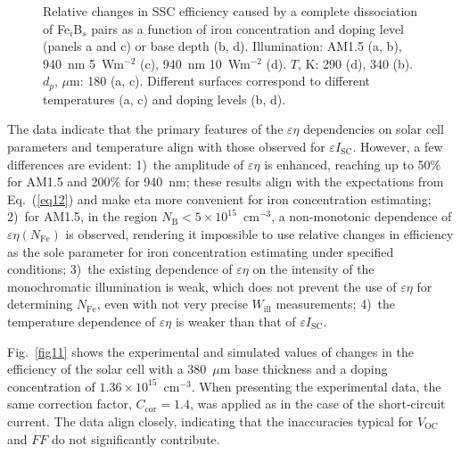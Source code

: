 \documentclass[a4paper,fleqn]{cas-sc}
\begin{document}
\begin{figure}
	  \caption{Relative changes in SSC efficiency caused by a complete
       dissociation of Fe$_i$B$_s$ pairs as a function of
       iron concentration and
       doping level (panels a and c) or base depth (b, d).
       Illumination: AM1.5 (a, b), 940~nm 5~Wm$^{-2}$ (c),  940~nm 10~Wm$^{-2}$ (d).
       $T$, K: 290 (d), 340 (b).
       $d_p$, $\mu$m: 180 (a, c).
       Different surfaces correspond to different temperatures (a, c) and doping levels (b, d).
}\label{fig10}
\end{figure}

The data indicate that the primary features of the $\varepsilon \eta$ dependencies
on solar cell parameters and temperature align with those observed for $\varepsilon I_\mathrm{SC}$.
However, a few differences are evident:
1)~the amplitude of  $\varepsilon \eta$ is enhanced,
reaching up to 50\% for AM1.5 and 200\% for 940~nm;
these results align with the expectations from Eq.~(\ref{eq12})
and make eta more convenient for iron concentration estimating;
2)~for AM1.5, in the region $N_\mathrm{B}<5\times10^{15}$~cm$^{-3}$,
a non-monotonic dependence of $\varepsilon \eta$$\left(N_\mathrm{Fe}\right)$ is observed,
rendering it impossible to use relative changes in efficiency as the sole parameter for iron concentration estimating under specified conditions;
3)~the existing dependence of $\varepsilon \eta$ on the intensity of the monochromatic illumination is weak,
which does not prevent the use of $\varepsilon \eta$ for determining $N_\mathrm{Fe}$, even with not very precise $W_\mathrm{ill}$ measurements;
4)~the temperature dependence of $\varepsilon \eta$ is weaker than that of $\varepsilon I_\mathrm{SC}$.


Fig.~\ref{fig11} shows the experimental and simulated values of changes in the efficiency of the solar cell
with a 380~$\mu$m base thickness and a doping concentration of $1.36\times10^{15}$~cm$^{-3}$.
When presenting the experimental data, the same correction factor, $C_\mathrm{cor} = 1.4$, was applied as in the case of the short-circuit current.
The data align closely, indicating that the inaccuracies typical for $V_\mathrm{OC}$ and $FF$ do not significantly contribute.
\end{document}

